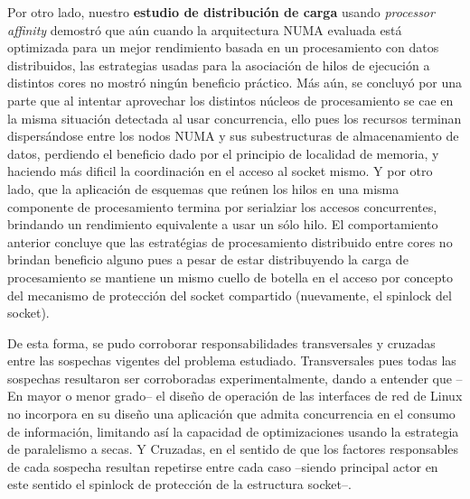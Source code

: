 \begin{conclusion}
 
Por otro lado, nuestro \textbf{estudio de distribución de carga} usando \emph{processor affinity} demostró que aún cuando la arquitectura NUMA evaluada está optimizada para un mejor rendimiento basada en un procesamiento con datos distribuidos, las estrategias usadas para la asociación de hilos de ejecución a distintos cores no mostró ningún beneficio práctico. Más aún, se concluyó por una parte que al intentar aprovechar los distintos núcleos de procesamiento se cae en la misma situación detectada al usar concurrencia, ello pues los recursos terminan dispersándose entre los nodos NUMA y sus subestructuras de almacenamiento de datos, perdiendo el beneficio dado por el principio de localidad de memoria, y haciendo más dificil la coordinación en el acceso al socket mismo. Y por otro lado, que la aplicación de esquemas que reúnen los hilos en una misma componente de procesamiento termina por serialziar los accesos concurrentes, brindando un rendimiento equivalente a usar un sólo hilo. El comportamiento anterior concluye que las estratégias de procesamiento distribuido entre cores no brindan beneficio alguno pues a pesar de estar distribuyendo la carga de procesamiento se mantiene un mismo cuello de botella en el acceso por concepto del mecanismo de protección del socket compartido (nuevamente, el spinlock del socket). 
 
 
De esta forma, se pudo corroborar responsabilidades transversales y cruzadas entre las sospechas vigentes del problema estudiado. Transversales pues todas las sospechas resultaron ser corroboradas experimentalmente, dando a entender que --En mayor o menor grado-- el diseño de operación de las interfaces de red de Linux no incorpora en su diseño una aplicación que admita concurrencia en el consumo de información, limitando así la capacidad de optimizaciones usando la estrategia de paralelismo a secas. Y Cruzadas, en el sentido de que los factores responsables de cada sospecha resultan repetirse entre cada caso --siendo principal actor en este sentido el spinlock de protección de la estructura socket--. 
 

\end{conclusion}
